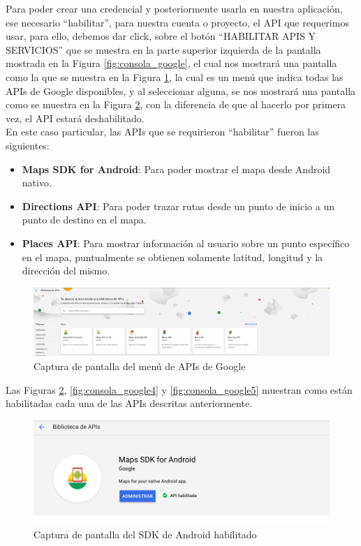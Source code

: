 Para poder crear una credencial y posteriormente usarla en nuestra aplicación, ese necesario ``habilitar'', para nuestra cuenta o proyecto, el API que requerimos usar, para ello, debemos dar click, sobre el botón ``HABILITAR APIS Y SERVICIOS'' que se muestra en la parte superior izquierda de la pantalla mostrada en la Figura \ref{fig:consola_google}, el cual nos mostrará una pantalla como la que se muestra en la Figura \ref{fig:consola_google2}, la cual es un menú que indica todas las APIs de Google disponibles, y al seleccionar alguna, se nos mostrará una pantalla como se muestra en la Figura \ref{fig:consola_google3}, con la diferencia de que al hacerlo por primera vez, el API estará deshabilitado.\\En este caso particular, las APIs que se requirieron ``habilitar'' fueron las siguientes:
\begin{itemize}
	\item \textbf{Maps SDK for Android}: Para poder mostrar el mapa desde Android nativo.
	\item \textbf{Directions API}: Para poder trazar rutas desde un punto de inicio a un punto de destino en el mapa.
	\item \textbf{Places API}: Para mostrar información al usuario sobre un punto específico en el mapa, puntualmente se obtienen solamente latitud, longitud y la dirección del mismo.
\end{itemize}

\begin{figure}[H]
	\centering
	\includegraphics[scale=.2]{Capitulo5/software/submodulos/aplicacion/images/2}
	\caption{Captura de pantalla del menú de APIs de Google}
	\label{fig:consola_google2}
\end{figure}

Las Figuras \ref{fig:consola_google3}, \ref{fig:consola_google4} y \ref{fig:consola_google5} muestran como están habilitadas cada una de las APIs descritas anteriormente.

\begin{figure}[H]
	\centering
	\includegraphics[scale=.3]{Capitulo5/software/submodulos/aplicacion/images/3}
	\caption{Captura de pantalla del SDK de Android habilitado}
	\label{fig:consola_google3}
\end{figure}

